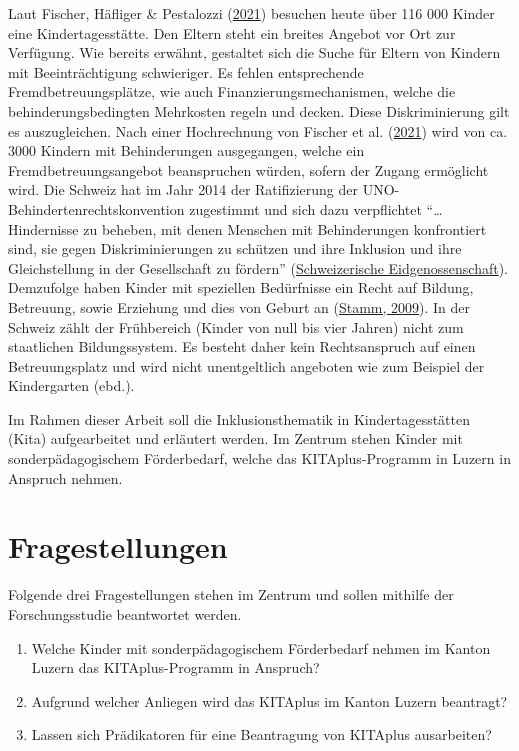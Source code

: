 \documentclass[
  ngerman,
  11pt,
  paper=a4,
  twoside,
  titlepage=true,
  openright,
  abstract=on,
  toc=listofnumbered,
  numbers=noenddot,
  chapterprefix=true,
  headings=optiontohead,
  svgnames,
  dvipsnames]{scrreprt}
\begin{document}
Laut Fischer, Häfliger \& Pestalozzi
(\protect\hyperlink{ref-angebotsmangel}{2021}) besuchen heute über 116
000 Kinder eine Kindertagesstätte. Den Eltern steht ein breites Angebot
vor Ort zur Verfügung. Wie bereits erwähnt, gestaltet sich die Suche für
Eltern von Kindern mit Beeinträchtigung schwieriger. Es fehlen
entsprechende Fremdbetreuungsplätze, wie auch Finanzierungsmechanismen,
welche die behinderungsbedingten Mehrkosten regeln und decken. Diese
Diskriminierung gilt es auszugleichen. Nach einer Hochrechnung von
Fischer et al. (\protect\hyperlink{ref-angebotsmangel}{2021}) wird von
ca. 3000 Kindern mit Behinderungen ausgegangen, welche ein
Fremdbetreuungsangebot beanspruchen würden, sofern der Zugang ermöglicht
wird. Die Schweiz hat im Jahr 2014 der Ratifizierung der
UNO-Behindertenrechtskonvention zugestimmt und sich dazu verpflichtet “…
Hindernisse zu beheben, mit denen Menschen mit Behinderungen
konfrontiert sind, sie gegen Diskriminierungen zu schützen und ihre
Inklusion und ihre Gleichstellung in der Gesellschaft zu fördern”
(\protect\hyperlink{ref-uno}{Schweizerische Eidgenossenschaft}).
Demzufolge haben Kinder mit speziellen Bedürfnisse ein Recht auf
Bildung, Betreuung, sowie Erziehung und dies von Geburt an
(\protect\hyperlink{ref-stamm}{Stamm, 2009}). In der Schweiz zählt der
Frühbereich (Kinder von null bis vier Jahren) nicht zum staatlichen
Bildungssystem. Es besteht daher kein Rechtsanspruch auf einen
Betreuungsplatz und wird nicht unentgeltlich angeboten wie zum Beispiel
der Kindergarten (ebd.).

Im Rahmen dieser Arbeit soll die Inklusionsthematik in
Kindertagesstätten (Kita) aufgearbeitet und erläutert werden. Im Zentrum
stehen Kinder mit sonderpädagogischem Förderbedarf, welche das
KITAplus-Programm in Luzern in Anspruch nehmen.

\hypertarget{sec:fragestellung}{%
\section{Fragestellungen}\label{sec:fragestellung}}

Folgende drei Fragestellungen stehen im Zentrum und sollen mithilfe der
Forschungsstudie beantwortet werden.

\begin{enumerate}
\def\labelenumi{\arabic{enumi}.}
\item
  Welche Kinder mit sonderpädagogischem Förderbedarf nehmen im Kanton
  Luzern das KITAplus-Programm in Anspruch?
\item
  Aufgrund welcher Anliegen wird das KITAplus im Kanton Luzern
  beantragt?
\item
  Lassen sich Prädikatoren für eine Beantragung von KITAplus
  ausarbeiten?
\end{enumerate}
\end{document}
